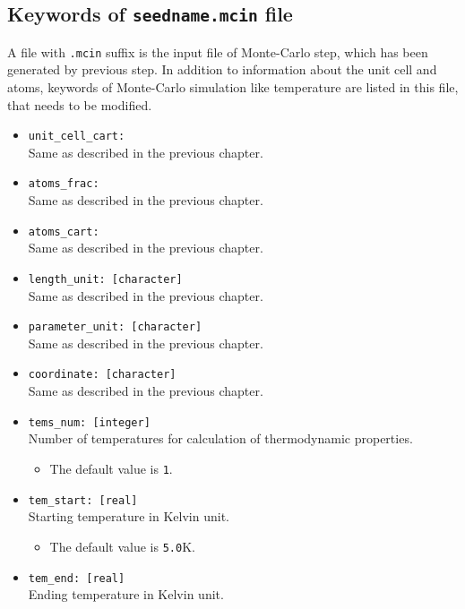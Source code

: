 \documentclass[10pt]{report}
\begin{document}
\subsection{Keywords of {\tt seedname.mcin} file}
A file with {\tt .mcin} suffix is the input file of Monte-Carlo step, which has been generated by previous step.
In addition to information about the unit cell and atoms, keywords of Monte-Carlo simulation like temperature
are listed in this file, that needs to be modified.
\begin{itemize}
\item {\tt unit\_cell\_cart: }                \\
Same as described in the previous chapter.
\item {\tt atoms\_frac: }                       \\
Same as described in the previous chapter.
\item {\tt atoms\_cart: }                       \\
Same as described in the previous chapter.
\item {\tt length\_unit: [character]}                       \\
Same as described in the previous chapter.
\item {\tt parameter\_unit: [character]}                       \\
Same as described in the previous chapter.
\item {\tt coordinate: [character]}                       \\
Same as described in the previous chapter.
\item {\tt tems\_num: [integer]}  \\
Number of temperatures for calculation of thermodynamic properties.
\begin{itemize} [label=\adfhalfrightarrowhead]
\item  The default value is {\tt 1}.
\end{itemize}
\item {\tt tem\_start: [real]}    \\
Starting temperature in Kelvin unit.
\begin{itemize} [label=\adfhalfrightarrowhead]
\item  The default value is {\tt 5.0}K.
\end{itemize}
\item {\tt tem\_end: [real]}      \\
Ending temperature in Kelvin unit.
\begin{itemize} [label=\adfhalfrightarrowhead]

\end{itemize}
\end{itemize}
\end{document}
